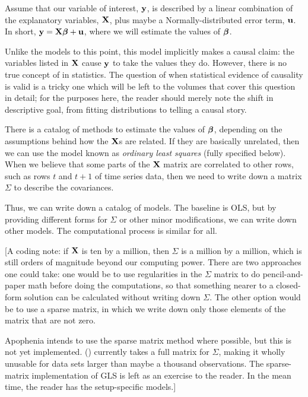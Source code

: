 Assume that our variable of interest, ${\bf y}$, is
described by a linear combination of the explanatory variables, ${\bf X}$,
plus maybe a Normally-distributed error term, ${\bf u}$. In short,
${\bf y}={\bf X}{\mbox{\boldmath$\beta$}} + {\bf u}$, where we will estimate the values of ${\mbox{\boldmath$\beta$}}$. 

Unlike the models to this point, this model implicitly makes a
causal claim: the variables listed in ${\bf X}$ cause ${\bf y}$ to take the values they
do. However, 
there is no true concept of  in statistics.
The question of when statistical evidence of causality is valid is a tricky
one which will be left to the volumes that cover this question in
detail; for the purposes here, the reader should merely note the shift in
descriptive goal, from fitting distributions to telling a causal story.

There is a catalog of methods to estimate the values of ${\mbox{\boldmath$\beta$}}$,
depending on the assumptions behind how the ${\bf X}$s are related. If they
are basically unrelated, then we can use the model known as {\em ordinary
least squares} (fully specified below). When we believe that some parts
of the ${\bf X}$ matrix are correlated to other rows, such as rows $t$ and
$t+1$ of 
time series data, then we need to write down a matrix
$\Sigma$ to describe the covariances.

Thus, we can write down a catalog of models. The baseline is OLS, but by
providing different forms for $\Sigma$ or other minor modifications, we
can write down other models. The computational process is similar
for all.

[A coding note: if ${\bf X}$ is ten by a million, then $\Sigma$ is a million
by a million, which is still orders of magnitude beyond our computing
power. There are two approaches one could take: one would be to use
regularities in the $\Sigma$ matrix to do pencil-and-paper math before
doing the computations, so that something nearer to a closed-form
solution can be calculated without writing down $\Sigma$. The other
option would be to use a sparse matrix, in which
we write down only those elements of the matrix that are not zero. 

Apophenia intends to use the sparse matrix method where possible, but this is not yet
implemented. () currently takes a full matrix
for $\Sigma$, making it wholly unusable for data sets larger than maybe a
thousand observations. The sparse-matrix implementation of GLS is
left as an exercise to the reader. In the mean time, the reader has the
setup-specific models.]

